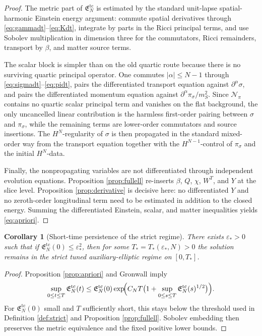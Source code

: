 \documentclass[11pt]{article}
\newtheorem{corollary}{Corollary}
\begin{document}
\begin{proof}
The metric part of \(\mathfrak E_N^{\mathrm{tc}}\) is estimated by the standard unit-lapse spatial-harmonic Einstein energy argument: commute spatial derivatives through \eqref{eq:gammadt}--\eqref{eq:Kdt}, integrate by parts in the Ricci principal terms, and use Sobolev multiplication in dimension three for the commutators, Ricci remainders, transport by \(\beta\), and matter source terms.

The scalar block is simpler than on the old quartic route because there is no surviving quartic principal operator. One commutes \(|\alpha|\le N-1\) through \eqref{eq:sigmadt}--\eqref{eq:pidt}, pairs the differentiated transport equation against \(\partial^\alpha\sigma\), and pairs the differentiated momentum equation against \(\partial^\alpha\pi_\sigma/m_S^2\). Since \(\mathcal N_\pi\) contains no quartic scalar principal term and vanishes on the flat background, the only uncancelled linear contribution is the harmless first-order pairing between \(\sigma\) and \(\pi_\sigma\), while the remaining terms are lower-order commutators and source insertions. The \(H^N\)-regularity of \(\sigma\) is then propagated in the standard mixed-order way from the transport equation together with the \(H^{N-1}\)-control of \(\pi_\sigma\) and the initial \(H^N\)-data.

Finally, the nonpropagating variables are not differentiated through independent evolution equations. Proposition \ref{prop:fullell} re-inserts \(\beta\), \(Q\), \(\chi\), \(W^T\), and \(Y\) at the slice level. Proposition \ref{prop:derivative} is decisive here: no differentiated \(Y\) and no zeroth-order longitudinal term need to be estimated in addition to the closed energy. Summing the differentiated Einstein, scalar, and matter inequalities yields \eqref{eq:apriori}.
\end{proof}

\begin{corollary}[Short-time persistence of the strict regime]
\label{cor:persist}
There exists \(\varepsilon_*>0\) such that if \(\mathfrak E_N^{\mathrm{tc}}(0)\le \varepsilon_*^2\), then for some \(T_*=T_*(\varepsilon_*,N)>0\) the solution remains in the strict tuned auxiliary-elliptic regime on \([0,T_*]\).
\end{corollary}

\begin{proof}
Proposition \ref{prop:apriori} and Gronwall imply
\[
\sup_{0\le t\le T}\mathfrak E_N^{\mathrm{tc}}(t)
\le
\mathfrak E_N^{\mathrm{tc}}(0)
\exp\!\Bigl(C_NT\bigl(1+\sup_{0\le s\le T}\mathfrak E_N^{\mathrm{tc}}(s)^{1/2}\bigr)\Bigr).
\]
For \(\mathfrak E_N^{\mathrm{tc}}(0)\) small and \(T\) sufficiently short, this stays below the threshold used in Definition \ref{def:strict} and Proposition \ref{prop:fullell}. Sobolev embedding then preserves the metric equivalence and the fixed positive lower bounds.
\end{proof}
\end{document}
